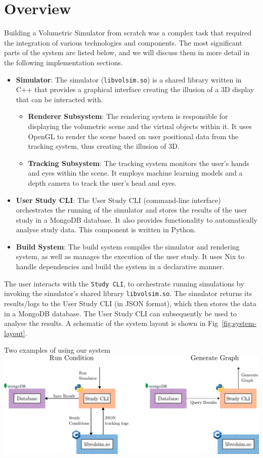 \section{Overview}

Building a Volumetric Simulator from scratch was a complex task that required the integration of various technologies and components. The most significant parts of the system are listed below, and we will discuss them in more detail in the following implementation sections.

\begin{itemize}[itemsep=-0.15em, label={}]
	\item \textbf{Simulator}: The simulator (\texttt{libvolsim.so}) is a shared library written in C++ that provides a graphical interface creating the illusion of a 3D display that can be interacted with.
	      \begin{itemize}[itemsep=-0.15em]
		      \item \textbf{Renderer Subsystem}: The rendering system is responsible for displaying the volumetric scene and the virtual objects within it. It uses OpenGL to render the scene based on user positional data from the tracking system, thus creating the illusion of 3D.
		      \item \textbf{Tracking Subsystem}: The tracking system monitors the user's hands and eyes within the scene. It employs machine learning models and a depth camera to track the user's head and eyes.
	      \end{itemize}
	\item \textbf{User Study CLI}: The User Study CLI (command-line interface) orchestrates the running of the simulator and stores the results of the user study in a MongoDB database. It also provides functionality to automatically analyse study data. This component is written in Python.
	\item \textbf{Build System}: The build system compiles the simulator and rendering system, as well as manages the execution of the user study. It uses Nix to handle dependencies and build the system in a declarative manner.
\end{itemize}

The user interacts with the \texttt{Study CLI}, to orchestrate running simulations by invoking the simulator's shared library \texttt{libvolsim.so}. The simulator returns its results/logs to the User Study CLI (in JSON format), which then stores the data in a MongoDB database. The User Study CLI can subsequently be used to analyse the results. A schematic of the system layout is shown in Fig~\ref{fig:system-layout}.

\begin{figureBox}[label={fig:system-layout}, width=1.0\linewidth]{Two examples of using our system}
    \includegraphics[width = 0.9\linewidth]{./implementation/figures/overall-system.pdf}
\end{figureBox}
